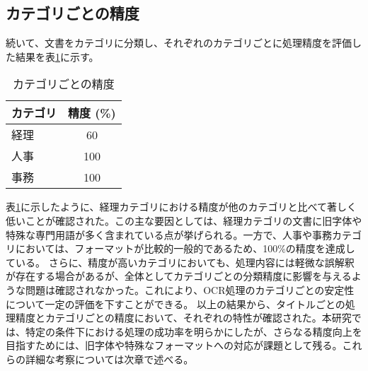 \clearpage

\subsection{カテゴリごとの精度}
\label{subsec:category}

続いて、文書をカテゴリに分類し、それぞれのカテゴリごとに処理精度を評価した結果を表\ref{tab:category_accuracy}に示す。

\begin{table}[h]
  \centering
  \begin{tabular}{|l|c|}
    \hline
    \textbf{カテゴリ} & \textbf{精度 (\%)} \\ \hline
    経理 & 60 \\ \hline
    人事 & 100 \\ \hline
    事務 & 100 \\ \hline
  \end{tabular}
  \caption{カテゴリごとの精度}
  \label{tab:category_accuracy}
\end{table}

表\ref{tab:category_accuracy}に示したように、経理カテゴリにおける精度が他のカテゴリと比べて著しく低いことが確認された。この主な要因としては、経理カテゴリの文書に旧字体や特殊な専門用語が多く含まれている点が挙げられる。一方で、人事や事務カテゴリにおいては、フォーマットが比較的一般的であるため、100\%の精度を達成している。
さらに、精度が高いカテゴリにおいても、処理内容には軽微な誤解釈が存在する場合があるが、全体としてカテゴリごとの分類精度に影響を与えるような問題は確認されなかった。これにより、OCR処理のカテゴリごとの安定性について一定の評価を下すことができる。
以上の結果から、タイトルごとの処理精度とカテゴリごとの精度において、それぞれの特性が確認された。本研究では、特定の条件下における処理の成功率を明らかにしたが、さらなる精度向上を目指すためには、旧字体や特殊なフォーマットへの対応が課題として残る。これらの詳細な考察については次章で述べる。
